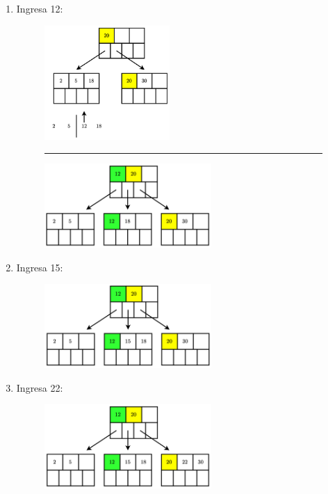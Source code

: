 \documentclass{templateNote}
\begin{document}
\begin{itemize}
\begin{enumerate}
\begin{enumerate}
\begin{enumerate}
                \item Ingresa 12:
                \begin{figure}[H]
                    \centering
                    \includegraphics[width=0.45\textwidth]{diagram/P3-1-6-1.png}
                    \rule{\textwidth}{1pt}
                    \includegraphics[width=0.6\textwidth]{diagram/P3-1-6-2.png}
                \end{figure}

                \newpage
                \item Ingresa 15:
                \begin{figure}[H]
                    \centering
                    \includegraphics[width=0.6\textwidth]{diagram/P3-1-7.png}
                \end{figure}

                \item Ingresa 22:
                \begin{figure}[H]
                    \centering
                    \includegraphics[width=0.6\textwidth]{diagram/P3-1-8.png}
                \end{figure}


\end{enumerate}
\end{enumerate}
\end{enumerate}
\end{itemize}
\end{document}
